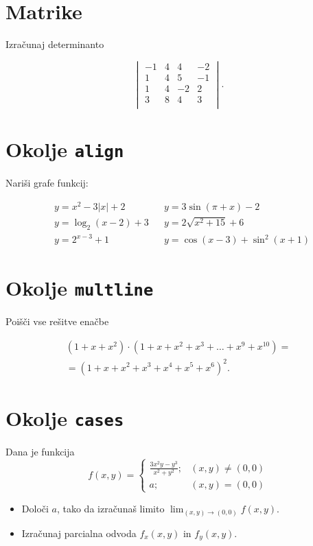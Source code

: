 \documentclass[a4paper,12pt]{article}
\begin{document}
\section*{Matrike}
Izračunaj determinanto
    
\[\begin{vmatrix}
      -1 & 4 & 4 & -2 \\
      1 & 4 & 5 & -1 \\
      1 & 4 & -2 & 2 \\
      3 & 8 & 4 & 3 \\
\end{vmatrix}.\]

\section*{Okolje \texttt{align}}
Nariši grafe funkcij:

\begin{align*}
   &y = x^2 - 3|x| + 2  && y = 3 \sin(\pi+x) - 2 \\
   &y = \log_2(x-2) + 3 &&  y = 2 \sqrt{x^2+15} + 6 \\
   &y = 2^{x-3} + 1     && y = \cos(x-3) + \sin^2(x+1) 
\end{align*}


\section*{Okolje \texttt{multline}}
Poišči vse rešitve enačbe


\begin{multline*}
   (1+x+x^2) \cdot (1+x+x^2+x^3+\ldots+x^9+x^{10}) =\\
   =(1+x+x^2+x^3+x^4+x^5+x^6)^2.
\end{multline*}


\section*{Okolje \texttt{cases}}
Dana je funkcija
    \[
    f(x,y) = 
    \begin{cases}
      \frac{3x^2y-y^3}{x^2+y^2}; &(x,y)\ne (0,0)\\
      a; & (x,y)=(0,0)
    \end{cases}\]

\begin{itemize}
\item Določi \(a\), tako da izračunaš limito \( \lim_{(x,y)\to(0,0)} f(x,y) \).
\item Izračunaj parcialna odvoda \(f_x(x,y)\) in \(f_y(x,y)\).
\end{itemize}
\end{document}
